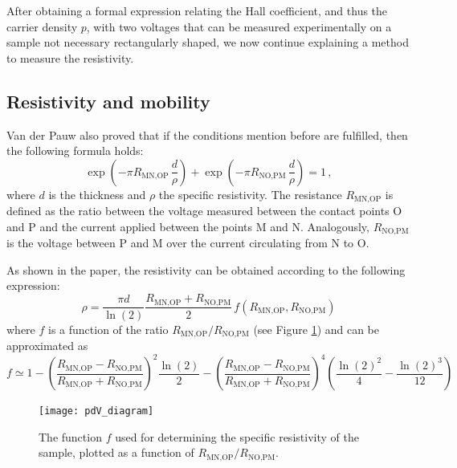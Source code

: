 \documentclass[11pt,a4paper]{article}
\begin{document}
After obtaining a formal expression relating the Hall coefficient, and thus the carrier density $p$, with two voltages that can be measured experimentally on a sample not necessary rectangularly shaped, we now continue explaining a method to measure the resistivity.

\subsection{Resistivity and mobility}

Van der Pauw also proved that if the conditions mention before are fulfilled, then the following formula holds:
\begin{equation}
\exp\left(-\pi R_\text{MN,OP}\,\frac{d}{\rho}\right)+\exp\left(-\pi R_\text{NO,PM}\,\frac{d}{\rho}\right)=1\,,
\end{equation}
where $d$ is the thickness and $\rho$ the specific resistivity. The resistance $R_\text{MN,OP}$ is defined as the ratio between the voltage measured between the contact points O and P and the current applied between the points M and N. Analogously, $R_\text{NO,PM}$ is the voltage between P and M over the current circulating from N to O.

As shown in the paper, the resistivity can be obtained according to the following expression:
\begin{equation}\label{eq:resistivity}
\rho=\frac{\pi d}{\ln(2)}\frac{R_\text{MN,OP}+R_\text{NO,PM}}{2}\,f\!\left(R_\text{MN,OP},R_\text{NO,PM}\right)
\end{equation}
where $f$ is a function of the ratio $R_\text{MN,OP}/R_\text{NO,PM}$ (see Figure \ref{fig:pdV_diagram}) and can be approximated as
\begin{equation}\label{eq:resistivity_f}
f \simeq 1-\left(\frac{R_\text{MN,OP}-R_\text{NO,PM}}{R_\text{MN,OP}+R_\text{NO,PM}}\right)^2 \frac{\ln(2)}{2}-\left(\frac{R_\text{MN,OP}-R_\text{NO,PM}}{R_\text{MN,OP}+R_\text{NO,PM}}\right)^4\left(\frac{\ln(2)^2}{4}-\frac{\ln(2)^3}{12}\right)
\end{equation}

\begin{figure}[ht]
\centering
\texttt{[image: pdV\_diagram]}
\caption{The function $f$ used for determining the specific resistivity of the sample, plotted as a function of $R_\text{MN,OP}/R_\text{NO,PM}$.\cite{vdP}}
\label{fig:pdV_diagram}
\end{figure}
\end{document}
